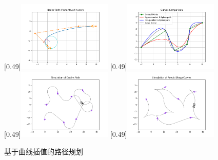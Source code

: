 \documentclass[master,academic]{ysuthesis} %
\begin{document}
		\begin{figure}[!ht]
			\centering
			[0.49\textwidth]{\includegraphics[width=0.4\textwidth]{插图/curve/bezier.png}}
			[0.49\textwidth]{\includegraphics[width=0.4\textwidth]{插图/curve/bspline.png}}
			[0.49\textwidth]{\includegraphics[width=0.4\textwidth]{插图/curve/dubins_path.png}}
			[0.49\textwidth]{\includegraphics[width=0.4\textwidth]{插图/curve/reeds_shepp.png}}
			\caption{基于曲线插值的路径规划}
			\label{fig:基于曲线插值的路径规划}
		\end{figure}
\end{document}
